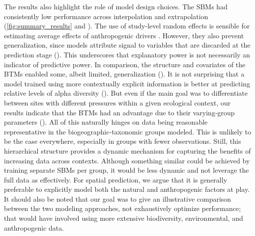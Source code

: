 The results also highlight the role of model design choices. The SBMs had consistently low performance across interpolation and extrapolation (\autoref{fig:summary_results} and ). The use of study-level random effects is sensible for estimating average effects of anthropogenic drivers \cite{harrison2018,pinheiro2000}. However, they also prevent generalization, since models attribute signal to variables that are discarded at the prediction stage (). This underscores that explanatory power is not necessarily an indicator of predictive power\cite{shmueli2010,tredennick2021}. In comparison, the structure and covariates of the BTMs enabled some, albeit limited, generalization (). It is not surprising that a model trained using more contextually explicit information is better at predicting relative levels of alpha diversity (). But even if the main goal was to differentiate between sites with different pressures within a given ecological context, our results indicate that the BTMs had an advantage due to their varying-group parameters (). All of this naturally hinges on data being reasonable representative in the biogeographic-taxonomic groups modeled. This is unlikely to be the case everywhere, especially in groups with fewer observations. Still, this hierarchical structure provides a dynamic mechanism for capturing the benefits of increasing data across contexts. Although something similar could be achieved by training separate SBMs per group, it would be less dynamic and not leverage the full data as effectively. For spatial prediction, we argue that it is generally preferable to explicitly model both the natural and anthropogenic factors at play. It should also be noted that our goal was to give an illustrative comparison between the two modeling approaches, not exhaustively optimize performance; that would have involved using more extensive biodiversity, environmental, and anthropogenic data.

